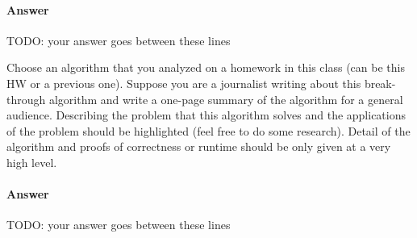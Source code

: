 \documentclass{article}
\begin{document}
\paragraph{Answer}


TODO: your answer goes between these lines



\nextprob
{}

Choose an algorithm that you analyzed on a homework in this class (can be this
HW or a previous one).  Suppose you are a journalist writing about this
break-through algorithm and write a one-page summary of the algorithm for a
general audience.  Describing the problem that this algorithm solves and the
applications of the problem should be highlighted (feel free to do some
research).  Detail of the algorithm and proofs of correctness or runtime should
be only given at a very high level.

\paragraph{Answer}


TODO: your answer goes between these lines

\end{document}
